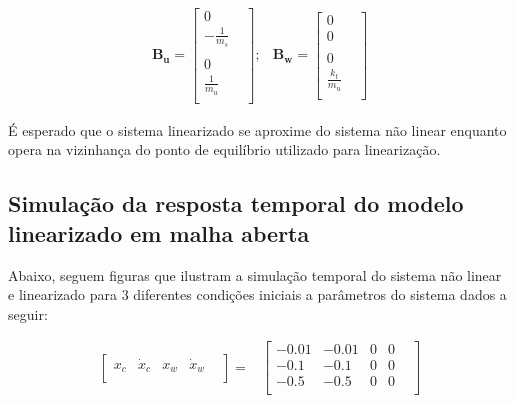     \begin{equation} 
    \begin{split}
        \mathbf{B_u} = 
        \begin{bmatrix}
            0 & \\            
            -\frac{1}{m_s}&\\ \\  
            0 & \\
            \frac{1}{m_u}&\\
        \end{bmatrix};
    \end{split}
    \begin{split}
        \mathbf{B_w} = 
        \begin{bmatrix}
            0 & \\            
            0 &\\ \\  
            0 & \\
            \frac{k_t}{m_u}& \\
        \end{bmatrix}
    \end{split}
    \end{equation}
    
    É esperado que o  sistema linearizado se aproxime do sistema não linear enquanto opera na vizinhança do ponto de equilíbrio utilizado para linearização. 
    
        \subsection{Simulação da resposta temporal do modelo linearizado em malha aberta}
    Abaixo, seguem figuras que ilustram a simulação temporal do sistema não linear e linearizado para 3 diferentes condições iniciais a parâmetros do sistema dados a seguir: 
    
    \begin{equation*} 
    \begin{split}
        \begin{bmatrix}
            x_c & \dot{x}_c & x_w & \dot{x}_w & \\
        \end{bmatrix}=
    \end{split}
    \begin{split}
        \begin{bmatrix}
            -0.01& -0.01& 0& 0& \\
             -0.1&  -0.1& 0& 0& \\
             -0.5&  -0.5& 0& 0&\\
        \end{bmatrix}
    \end{split}
    \end{equation*}
    
